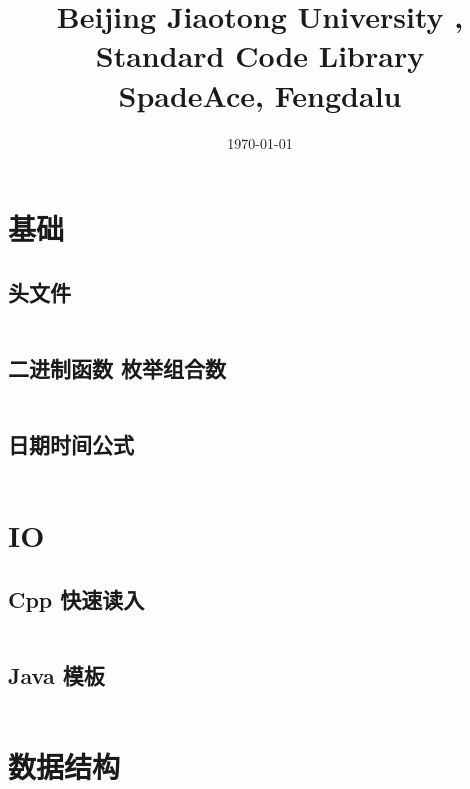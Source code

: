 \documentclass[titlepage,landscape,a4paper,10pt]{article}
\title{\LARGE{Beijing Jiaotong University , Standard Code Library} \\
[2ex] \Large{SpadeAce, Fengdalu} }
\date{\today}
\begin{document}
\maketitle

\begin{multicols*}{2}

    \begin{spacing}{0}
        \tableofcontents
    \end{spacing}
\end{multicols*}

\begin{multicols}{2}

\newpage
\begin{spacing}{0.8}

\section{基础}

\subsection{头文件}
\inputminted{cpp}{Basic/headers.cpp}

\subsection{二进制函数 枚举组合数}
\inputminted{cpp}{Basic/枚举组合.cpp}

\subsection{日期时间公式}
\inputminted{cpp}{Basic/zeller.cpp}

\section{IO}

\subsection{Cpp 快速读入}
\inputminted{cpp}{IO/fastio.cpp}

\subsection{Java 模板}
\inputminted{java}{IO/Main.java}

\section{数据结构}


\end{spacing}
\end{multicols}
\end{document}

